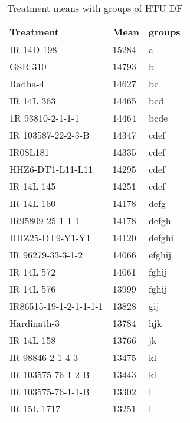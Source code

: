 \documentclass[]{article}
\begin{document}
\begin{longtable}{lll}
\caption{\label{tab:two-fac-groups-tab-agroclimate-early}Treatment means with groups of HTU DF}\\
\toprule
Treatment & Mean & groups\\
\midrule
\rowcolor{gray!6}  IR 14D 198 & 15284 & a\\
GSR 310 & 14793 & b\\
\rowcolor{gray!6}  Radha-4 & 14627 & bc\\
IR 14L 363 & 14465 & bcd\\
\rowcolor{gray!6}  1R 93810-2-1-1-1 & 14464 & bcde\\
\addlinespace
IR 103587-22-2-3-B & 14347 & cdef\\
\rowcolor{gray!6}  IR08L181 & 14335 & cdef\\
HHZ6-DT1-L11-L11 & 14295 & cdef\\
\rowcolor{gray!6}  IR 14L 145 & 14251 & cdef\\
IR 14L 160 & 14178 & defg\\
\addlinespace
\rowcolor{gray!6}  IR95809-25-1-1-1 & 14178 & defgh\\
HHZ25-DT9-Y1-Y1 & 14120 & defghi\\
\rowcolor{gray!6}  IR 96279-33-3-1-2 & 14066 & efghij\\
IR 14L 572 & 14061 & fghij\\
\rowcolor{gray!6}  IR 14L 576 & 13999 & fghij\\
\addlinespace
IR86515-19-1-2-1-1-1-1 & 13828 & gij\\
\rowcolor{gray!6}  Hardinath-3 & 13784 & hjk\\
IR 14L 158 & 13766 & jk\\
\rowcolor{gray!6}  IR 98846-2-1-4-3 & 13475 & kl\\
IR 103575-76-1-2-B & 13443 & kl\\
\addlinespace
\rowcolor{gray!6}  IR 103575-76-1-1-B & 13302 & l\\
IR 15L 1717 & 13251 & l\\
\bottomrule
\end{longtable}
\endgroup{}
\begingroup\fontsize{12}{14}\selectfont
\end{document}

